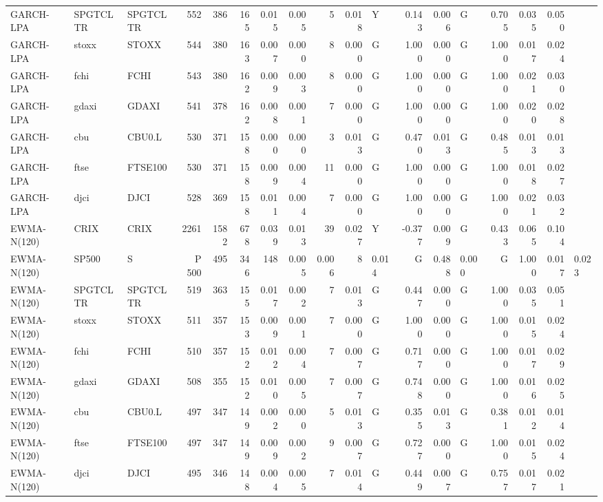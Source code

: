 \begin{table}[H]
\begin{tabular}{lllrrrrrrrlrrlrrr}
GARCH-LPA & SPGTCLTR & SPGTCLTR & 552 & 386 & 165 & 0.015 & 0.005 & 5 & 0.018 & Y & 0.143 & 0.006 & G & 0.705 & 0.035 & 0.050 \\
GARCH-LPA & stoxx & STOXX & 544 & 380 & 163 & 0.007 & 0.000 & 8 & 0.000 & G & 1.000 & 0.000 & G & 1.000 & 0.017 & 0.024 \\
GARCH-LPA & fchi & FCHI & 543 & 380 & 162 & 0.009 & 0.003 & 8 & 0.000 & G & 1.000 & 0.000 & G & 1.000 & 0.021 & 0.030 \\
GARCH-LPA & gdaxi & GDAXI & 541 & 378 & 162 & 0.008 & 0.001 & 7 & 0.000 & G & 1.000 & 0.000 & G & 1.000 & 0.020 & 0.028 \\
GARCH-LPA & cbu & CBU0.L & 530 & 371 & 158 & 0.000 & 0.000 & 3 & 0.013 & G & 0.470 & 0.013 & G & 0.485 & 0.013 & 0.013 \\
GARCH-LPA & ftse & FTSE100 & 530 & 371 & 158 & 0.009 & 0.004 & 11 & 0.000 & G & 1.000 & 0.000 & G & 1.000 & 0.018 & 0.027 \\
GARCH-LPA & djci & DJCI & 528 & 369 & 158 & 0.011 & 0.004 & 7 & 0.000 & G & 1.000 & 0.000 & G & 1.000 & 0.021 & 0.032 \\
EWMA-N(120) & CRIX & CRIX & 2261 & 1582 & 678 & 0.039 & 0.013 & 39 & 0.027 & Y & -0.377 & 0.009 & G & 0.433 & 0.065 & 0.104 \\
EWMA-N(120) & SP500 & S&P 500 & 495 & 346 & 148 & 0.005 & 0.006 & 8 & 0.014 & G & 0.488 & 0.000 & G & 1.000 & 0.017 & 0.023 \\
EWMA-N(120) & SPGTCLTR & SPGTCLTR & 519 & 363 & 155 & 0.017 & 0.002 & 7 & 0.013 & G & 0.447 & 0.000 & G & 1.000 & 0.035 & 0.051 \\
EWMA-N(120) & stoxx & STOXX & 511 & 357 & 153 & 0.009 & 0.001 & 7 & 0.000 & G & 1.000 & 0.000 & G & 1.000 & 0.015 & 0.024 \\
EWMA-N(120) & fchi & FCHI & 510 & 357 & 152 & 0.012 & 0.004 & 7 & 0.007 & G & 0.717 & 0.000 & G & 1.000 & 0.017 & 0.029 \\
EWMA-N(120) & gdaxi & GDAXI & 508 & 355 & 152 & 0.010 & 0.005 & 7 & 0.007 & G & 0.748 & 0.000 & G & 1.000 & 0.016 & 0.025 \\
EWMA-N(120) & cbu & CBU0.L & 497 & 347 & 149 & 0.002 & 0.000 & 5 & 0.013 & G & 0.355 & 0.013 & G & 0.381 & 0.012 & 0.014 \\
EWMA-N(120) & ftse & FTSE100 & 497 & 347 & 149 & 0.009 & 0.002 & 9 & 0.007 & G & 0.727 & 0.000 & G & 1.000 & 0.015 & 0.024 \\
EWMA-N(120) & djci & DJCI & 495 & 346 & 148 & 0.004 & 0.005 & 7 & 0.014 & G & 0.449 & 0.007 & G & 0.757 & 0.017 & 0.021 \\

\end{tabular}
\end{table}
